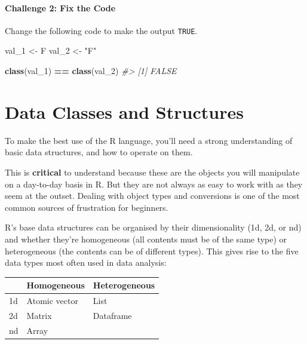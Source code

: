 \documentclass[]{book}
\newenvironment{Shaded}{\begin{snugshade}}{\end{snugshade}}
\newcommand{\CommentTok}[1]{\textcolor[rgb]{0.56,0.35,0.01}{\textit{#1}}}
\newcommand{\DecValTok}[1]{\textcolor[rgb]{0.00,0.00,0.81}{#1}}
\newcommand{\KeywordTok}[1]{\textcolor[rgb]{0.13,0.29,0.53}{\textbf{#1}}}
\newcommand{\NormalTok}[1]{#1}
\newcommand{\OperatorTok}[1]{\textcolor[rgb]{0.81,0.36,0.00}{\textbf{#1}}}
\newcommand{\StringTok}[1]{\textcolor[rgb]{0.31,0.60,0.02}{#1}}
\begin{document}
\hypertarget{challenge-2-fix-the-code}{%
\subsubsection*{Challenge 2: Fix the Code}\label{challenge-2-fix-the-code}}

Change the following code to make the output \texttt{TRUE}.

\begin{Shaded}
\begin{Highlighting}[]
\NormalTok{val_}\DecValTok{1}\NormalTok{ <-}\StringTok{ }\NormalTok{F}
\NormalTok{val_}\DecValTok{2}\NormalTok{ <-}\StringTok{ "F"}

\KeywordTok{class}\NormalTok{(val_}\DecValTok{1}\NormalTok{) }\OperatorTok{==}\StringTok{ }\KeywordTok{class}\NormalTok{(val_}\DecValTok{2}\NormalTok{)}
\CommentTok{#> [1] FALSE}
\end{Highlighting}
\end{Shaded}

\hypertarget{data-classes-and-structures}{%
\chapter{Data Classes and Structures}\label{data-classes-and-structures}}

To make the best use of the R language, you'll need a strong understanding of basic data structures, and how to operate on them.

This is \textbf{critical} to understand because these are the objects you will manipulate on a day-to-day basis in R. But they are not always as easy to work with as they seem at the outset. Dealing with object types and conversions is one of the most common sources of frustration for beginners.

R's base data structures can be organised by their dimensionality (1d, 2d, or nd) and whether they're homogeneous (all contents must be of the same type) or heterogeneous (the contents can be of different types). This gives rise to the five data types most often used in data analysis:

\begin{longtable}[]{@{}lll@{}}
\toprule
& Homogeneous & Heterogeneous\tabularnewline
\midrule
\endhead
1d & Atomic vector & List\tabularnewline
2d & Matrix & Dataframe\tabularnewline
nd & Array &\tabularnewline
\bottomrule
\end{longtable}
\end{document}
